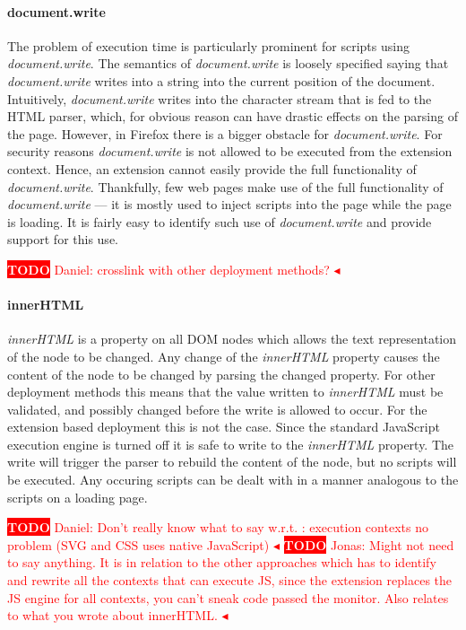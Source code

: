\documentclass{llncs}
\newcommand{\todo}[1]{\colorbox{red}{\textcolor{white}{\sffamily\bfseries\scriptsize TODO}} \textcolor{red}{#1} \textcolor{red}{$\blacktriangleleft$}}
\begin{document}
\paragraph{document.write} The problem of execution time is particularly
prominent for scripts using \emph{document.write}. The semantics of
\emph{document.write} is loosely specified saying that \emph{document.write}
writes into a string into the current position of the document.  Intuitively,
\emph{document.write} writes into the character stream that is fed to the HTML
parser, which, for obvious reason can have drastic effects on the parsing of
the page.  However, in Firefox there is a bigger obstacle for
\emph{document.write}. For security reasons \emph{document.write} is not
allowed to be executed from the extension context.  Hence, an extension cannot
easily provide the full functionality of \emph{document.write}.  Thankfully,
few web pages make use of the full functionality of \emph{document.write} ---
it is mostly used to inject scripts into the page while the page is loading. It
is fairly easy to identify such use of \emph{document.write} and provide
support for this use.


\todo{Daniel: crosslink with other deployment methods?} \paragraph{innerHTML}
%
\emph{innerHTML} is a property on all DOM nodes which allows the text
representation of the node to be changed. Any change of the \emph{innerHTML}
property causes the content of the node to be changed by parsing the changed
property. For other deployment methods this means that the value written to
\emph{innerHTML} must be validated, and possibly changed before the write is
allowed to occur.  For the extension based deployment this is not the case.
Since the standard JavaScript execution engine is turned off it is safe to
write to the \emph{innerHTML} property. The write will trigger the parser to
rebuild the content of the node, but no scripts will be executed.  Any occuring
scripts can be dealt with in a manner analogous to the scripts on a loading
page.

\todo{Daniel: Don't really know what to say w.r.t. : execution contexts no problem (SVG and CSS uses native JavaScript)}
\todo{Jonas: Might not need to say anything. It is in relation to the other approaches 
which has to identify and rewrite all the contexts that can execute JS, since the 
extension replaces the JS engine for all contexts, you can't sneak code passed the monitor. Also relates to what you wrote about innerHTML.}
\end{document}
